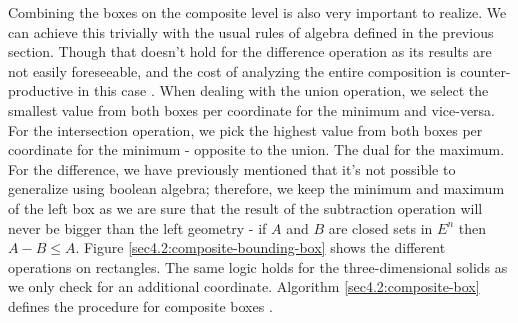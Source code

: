 \documentclass[a4paper,11pt,oneside]{article}
\begin{document}
Combining the boxes on the composite level is also very important to realize. We can achieve this trivially with the usual rules of algebra defined in the previous section. Though that doesn't hold for the difference operation as its results are not easily foreseeable, and the cost of analyzing the entire composition is counter-productive in this case \cite{ROTH1982109}. When dealing with the union operation, we select the smallest value from both boxes per coordinate for the minimum and vice-versa. For the intersection operation, we pick the highest value from both boxes per coordinate for the minimum - opposite to the union.
The dual for the maximum.  For the difference, we have previously mentioned that it's not possible to generalize using boolean algebra; therefore, we keep the minimum and maximum of the left box as we are sure that the result of the subtraction operation will never be bigger than the left geometry - if $A$ and $B$ are closed sets in $E^n$ then $A - B \leq A$. Figure \ref{sec4.2:composite-bounding-box} shows the different operations on rectangles. The same logic holds for the three-dimensional solids as we only check for an additional coordinate. Algorithm \ref{sec4.2:composite-box} defines the procedure for composite boxes \cite{ROTH1982109}.
\end{document}
